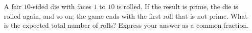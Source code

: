 A fair $10$-sided die with faces $1$ to $10$ is rolled. If the result is prime, the die is rolled again, and so on; the game ends with the first roll that is not prime. What is the expected total number of rolls? Express your answer as a common fraction.
